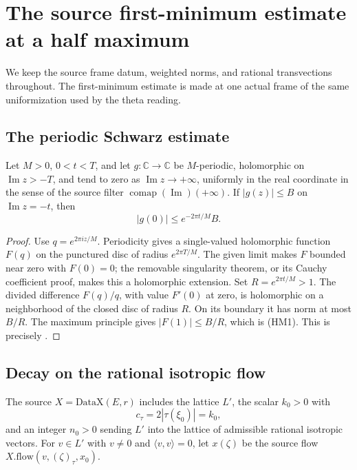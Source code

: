 \section{The source first-minimum estimate at a half maximum}
\label{sec:sr-source-half-maximum}
We keep the source frame datum, weighted norms, and rational
transvections throughout. The first-minimum estimate is made at
one actual frame of the same uniformization used by the theta reading.

\subsection{The periodic Schwarz estimate}
\begin{srlemma}\label{lem:sr-source-periodic-schwarz}
Let \(M>0\), \(0<t<T\), and let \(g:\mathbb C\to\mathbb C\) be
\(M\)-periodic, holomorphic on \(\operatorname{Im}z>-T\), and tend
to zero as \(\operatorname{Im}z\to+\infty\), uniformly in the real
coordinate in the sense of the source filter
\(\operatorname{comap}(\operatorname{Im})(+\infty)\).
If \(|g(z)|\le B\) on \(\operatorname{Im}z=-t\), then
\[
                    |g(0)|\le e^{-2\pi t/M}B .
 \tag{HM1}\label{eq:sr-source-periodic-schwarz}
\]
\end{srlemma}
\begin{proof}
Use \(q=e^{2\pi iz/M}\). Periodicity gives a single-valued
holomorphic function \(F(q)\) on the punctured disc of radius
\(e^{2\pi T/M}\).
The given limit makes \(F\) bounded near zero with \(F(0)=0\);
the removable singularity theorem, or its Cauchy coefficient proof,
makes this a holomorphic extension.
Set \(R=e^{2\pi t/M}>1\).
The divided difference \(F(q)/q\), with value \(F'(0)\) at zero,
is holomorphic on a neighborhood of the closed disc of radius \(R\).
On its boundary it has norm at most \(B/R\).
The maximum principle gives \(|F(1)|\le B/R\), which is (HM1).
This is precisely
.
\end{proof}

\subsection{Decay on the rational isotropic flow}
The source \(X=\mathrm{DataX}(E,r)\) includes the lattice \(L'\),
the scalar \(k_0>0\) with
\[
                     c_\tau=2|\tau(\xi_0)|=k_0,
\]
and an integer \(n_0>0\) sending \(L'\) into the lattice of
admissible rational isotropic vectors.
For \(v\in L'\) with \(v\ne0\) and
\(\langle v,v\rangle=0\), let \(x(\zeta)\) be the source flow
\(X.\mathrm{flow}(v,(\zeta)_\tau,x_0)\).


